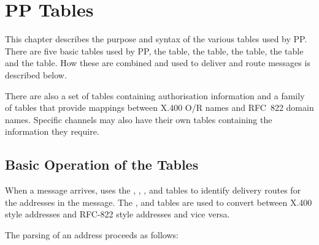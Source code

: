 \chapter {PP Tables}\label{sect:tables}

This chapter describes the purpose and syntax of the various tables
used by PP.
There are five basic tables used by PP, the  table, the
 table, the  table, the 
table and the  table.  How these are combined and used to
deliver and route messages is described below.

There are also a set of tables containing authorisation information
and a family of tables that provide mappings between X.400 O/R names
and RFC~822 domain names.  Specific channels may also have their own
tables containing the information they require.

\section{Basic Operation of the Tables}

When a message arrives,  uses the ,
, ,  and  tables to
identify delivery routes for the addresses in the message.
The ,  and  tables are
used to convert between X.400 style addresses and RFC-822 style 
addresses and vice versa.

The parsing of an address proceeds as follows:

